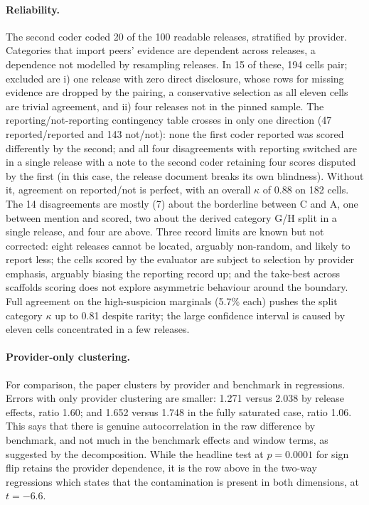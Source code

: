 \paragraph{Reliability.}
The second coder coded 20 of the 100 readable releases, stratified by provider. Categories that import peers' evidence are dependent across releases, a dependence not modelled by resampling releases. In 15 of these, 194 cells pair; excluded are i) one release with zero direct disclosure, whose rows for missing evidence are dropped by the pairing, a conservative selection as all eleven cells are trivial agreement, and ii) four releases not in the pinned sample. The reporting/not-reporting contingency table crosses in only one direction (47 reported/reported and 143 not/not): none the first coder reported was scored differently by the second; and all four disagreements with reporting switched are in a single release with a note to the second coder retaining four scores disputed by the first (in this case, the release document breaks its own blindness). Without it, agreement on reported/not is perfect, with an overall $\kappa$ of 0.88 on 182 cells. The 14 disagreements are mostly (7) about the borderline between C and A, one between mention and scored, two about the derived category G/H split in a single release, and four are above. Three record limits are known but not corrected: eight releases cannot be located, arguably non-random, and likely to report less; the cells scored by the evaluator are subject to selection by provider emphasis, arguably biasing the reporting record up; and the take-best across scaffolds scoring does not explore asymmetric behaviour around the boundary. Full agreement on the high-suspicion marginals (5.7\% each) pushes the split category $\kappa$ up to 0.81 despite rarity; the large confidence interval is caused by eleven cells concentrated in a few releases.

\paragraph{Provider-only clustering.}
For comparison, the paper clusters by provider and benchmark in regressions. Errors with only provider clustering are smaller: 1.271 versus 2.038 by release effects, ratio 1.60; and 1.652 versus 1.748 in the fully saturated case, ratio 1.06. This says that there is genuine autocorrelation in the raw difference by benchmark, and not much in the benchmark effects and window terms, as suggested by the decomposition. While the headline test at $p = 0.0001$ for sign flip retains the provider dependence, it is the row above in the two-way regressions which states that the contamination is present in both dimensions, at $t = -6.6$.

